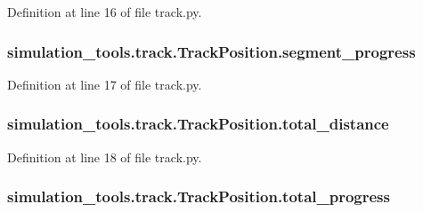 Definition at line 16 of file track.\+py.

\subsubsection[{\texorpdfstring{segment\+\_\+progress}{segment_progress}}]{\setlength{\rightskip}{0pt plus 5cm}simulation\+\_\+tools.\+track.\+Track\+Position.\+segment\+\_\+progress}\hypertarget{classsimulation__tools_1_1track_1_1_track_position_a1ce2f49333cc2e6d5ac1094a3e919eeb}{}\label{classsimulation__tools_1_1track_1_1_track_position_a1ce2f49333cc2e6d5ac1094a3e919eeb}


Definition at line 17 of file track.\+py.

\subsubsection[{\texorpdfstring{total\+\_\+distance}{total_distance}}]{\setlength{\rightskip}{0pt plus 5cm}simulation\+\_\+tools.\+track.\+Track\+Position.\+total\+\_\+distance}\hypertarget{classsimulation__tools_1_1track_1_1_track_position_a488a7374a672827079686cf7fece12ee}{}\label{classsimulation__tools_1_1track_1_1_track_position_a488a7374a672827079686cf7fece12ee}


Definition at line 18 of file track.\+py.

\subsubsection[{\texorpdfstring{total\+\_\+progress}{total_progress}}]{\setlength{\rightskip}{0pt plus 5cm}simulation\+\_\+tools.\+track.\+Track\+Position.\+total\+\_\+progress}\hypertarget{classsimulation__tools_1_1track_1_1_track_position_a0471b3519ccab2dfd048ed02853f8a8d}{}\label{classsimulation__tools_1_1track_1_1_track_position_a0471b3519ccab2dfd048ed02853f8a8d}


